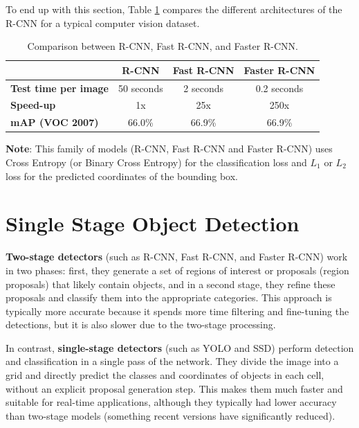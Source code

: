 To end up with this section, Table \ref{rcnn_comparison} compares the different architectures of the R-CNN for a typical computer vision dataset.

\begin{table}[h!]
\begin{tabular}{|l|c|c|c|}
\hline
\textbf{}               & \textbf{R-CNN} & \textbf{Fast R-CNN} & \textbf{Faster R-CNN} \\ \hline
\textbf{Test time per image} & 50 seconds      & 2 seconds            & 0.2 seconds           \\ \hline
\textbf{Speed-up}           & 1x              & 25x                  & 250x                  \\ \hline
\textbf{mAP (VOC 2007)}     & 66.0\%          & 66.9\%               & 66.9\%                \\ \hline
\end{tabular}
\caption{Comparison between R-CNN, Fast R-CNN, and Faster R-CNN.}
\label{rcnn_comparison}
\end{table}

\textbf{Note}: This family of models (R-CNN, Fast R-CNN and Faster R-CNN) uses Cross Entropy (or Binary Cross Entropy) for the classification loss and $L_1$ or $L_2$ loss for the predicted coordinates of the bounding box.


\section{Single Stage Object Detection}

\textbf{Two-stage detectors} (such as R-CNN, Fast R-CNN, and Faster R-CNN) work in two phases: first, they generate a set of regions of interest or proposals (region proposals) that likely contain objects, and in a second stage, they refine these proposals and classify them into the appropriate categories. This approach is typically more accurate because it spends more time filtering and fine-tuning the detections, but it is also slower due to the two-stage processing.

In contrast, \textbf{single-stage detectors} (such as YOLO and SSD) perform detection and classification in a single pass of the network. They divide the image into a grid and directly predict the classes and coordinates of objects in each cell, without an explicit proposal generation step. This makes them much faster and suitable for real-time applications, although they typically had lower accuracy than two-stage models (something recent versions have significantly reduced).

